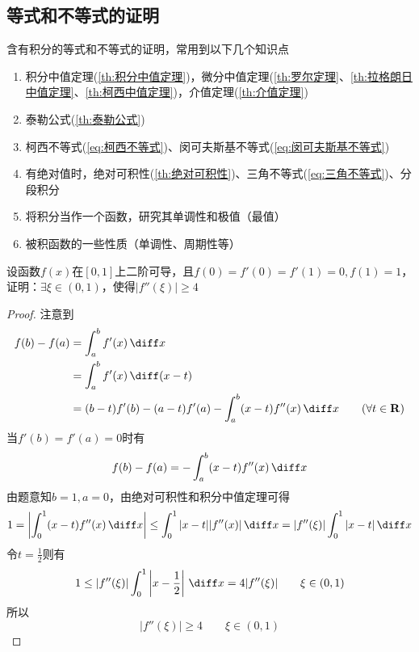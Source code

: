 \subsection{等式和不等式的证明}
含有积分的等式和不等式的证明，常用到以下几个知识点
\begin{enumerate}
    \item 积分中值定理(\ref{th:积分中值定理})，微分中值定理(\ref{th:罗尔定理}、\ref{th:拉格朗日中值定理}、\ref{th:柯西中值定理})，介值定理(\ref{th:介值定理})
    \item 泰勒公式(\ref{th:泰勒公式})
    \item 柯西不等式(\ref{eq:柯西不等式})、闵可夫斯基不等式(\ref{eq:闵可夫斯基不等式})
    \item 有绝对值时，绝对可积性(\ref{th:绝对可积性})、三角不等式(\ref{eq:三角不等式})、分段积分
    \item 将积分当作一个函数，研究其单调性和极值（最值）
    \item 被积函数的一些性质（单调性、周期性等）
\end{enumerate}
\begin{example}
    设函数$f(x)$在$[0,1]$上二阶可导，且$f(0)=f'(0)=f'(1)=0, f(1)=1$，
    证明：$\exists\xi\in(0,1)$，使得$|f''(\xi)|\geq 4$
\end{example}
\begin{proof}
    注意到
    \begin{align*}
        f(b) - f(a) & = \int_a^b f'(x)\,\diff x                                                                \\
                    & = \int_a^b f'(x)\,\diff (x-t)                                                            \\
                    & = (b-t)f'(b)-(a-t)f'(a) - \int_a^b (x-t)f''(x)\,\diff x \qquad (\forall t\in \mathbf{R})
    \end{align*}
    当$f'(b)=f'(a)=0$时有
    \[ f(b) - f(a) = -\int_a^b (x-t)f''(x)\,\diff x \]
    由题意知$b=1,a=0$，由绝对可积性和积分中值定理可得
    \[
        1
        =
        \left| \int_0^1 (x-t)f''(x)\,\diff x \right|
        \leq
        \int_0^1 |x-t||f''(x)|\,\diff x
        = |f''(\xi)|\int_0^1|x-t|\,\diff x
    \]
    令$t=\frac{1}{2}$则有
    \[ 1 \leq |f''(\xi)| \int_0^1\left|x-\frac{1}{2}\right|\,\diff x = 4|f''(\xi)| \qquad \xi\in(0,1)\]
    所以\[ |f''(\xi)| \geq 4 \qquad \xi\in(0,1) \]
\end{proof}

